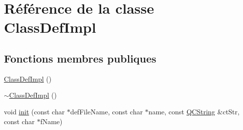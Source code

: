 \hypertarget{class_class_def_impl}{}\section{Référence de la classe Class\+Def\+Impl}
\label{class_class_def_impl}
\subsection*{Fonctions membres publiques}
\begin{DoxyCompactItemize}
\item 
\hyperlink{class_class_def_impl_ad6c6539c7e52207d625010ad5cdf166a}{Class\+Def\+Impl} ()
\item 
\hyperlink{class_class_def_impl_afe3ebfc701c9477e8d31a8957f8d772d}{$\sim$\+Class\+Def\+Impl} ()
\item 
void \hyperlink{class_class_def_impl_a4876a8d9d670f4f6f524e92909a557c4}{init} (const char $\ast$def\+File\+Name, const char $\ast$name, const \hyperlink{class_q_c_string}{Q\+C\+String} \&ct\+Str, const char $\ast$f\+Name)
\end{DoxyCompactItemize}
